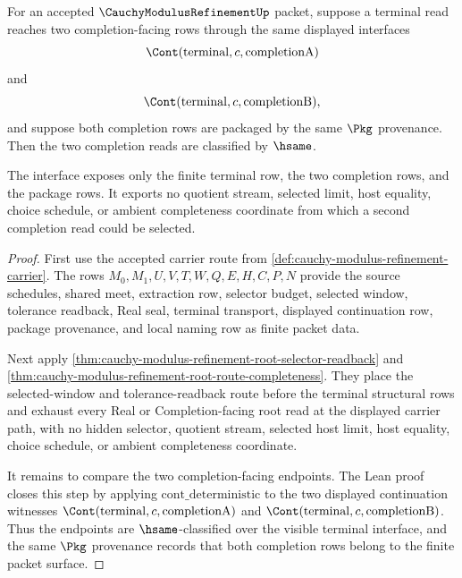 \begin{theorem}
\label{thm:cauchy-modulus-refinement-complete-metric-no-choice-interface}
For an accepted $\CauchyModulusRefinementUp$ packet, suppose a terminal read reaches two completion-facing rows through the same displayed interfaces
$$
\Cont(\mathrm{terminal},c,\mathrm{completionA})
$$
and
$$
\Cont(\mathrm{terminal},c,\mathrm{completionB}),
$$
and suppose both completion rows are packaged by the same $\Pkg$ provenance. Then the two completion reads are classified by $\hsame$.

The interface exposes only the finite terminal row, the two completion rows, and the package rows. It exports no quotient stream, selected limit, host equality, choice schedule, or ambient completeness coordinate from which a second completion read could be selected.
\end{theorem}
\begin{proof}
First use the accepted carrier route from \autoref{def:cauchy-modulus-refinement-carrier}. The rows $M_0,M_1,U,V,T,W,Q,E,H,C,P,N$ provide the source schedules, shared meet, extraction row, selector budget, selected window, tolerance readback, Real seal, terminal transport, displayed continuation row, package provenance, and local naming row as finite packet data.

Next apply \autoref{thm:cauchy-modulus-refinement-root-selector-readback} and \autoref{thm:cauchy-modulus-refinement-root-route-completeness}. They place the selected-window and tolerance-readback route before the terminal structural rows and exhaust every Real or Completion-facing root read at the displayed carrier path, with no hidden selector, quotient stream, selected host limit, host equality, choice schedule, or ambient completeness coordinate.

It remains to compare the two completion-facing endpoints. The Lean proof closes this step by applying $\mathrm{cont\_deterministic}$ to the two displayed continuation witnesses $\Cont(\mathrm{terminal},c,\mathrm{completionA})$ and $\Cont(\mathrm{terminal},c,\mathrm{completionB})$. Thus the endpoints are $\hsame$-classified over the visible terminal interface, and the same $\Pkg$ provenance records that both completion rows belong to the finite packet surface.
\end{proof}

